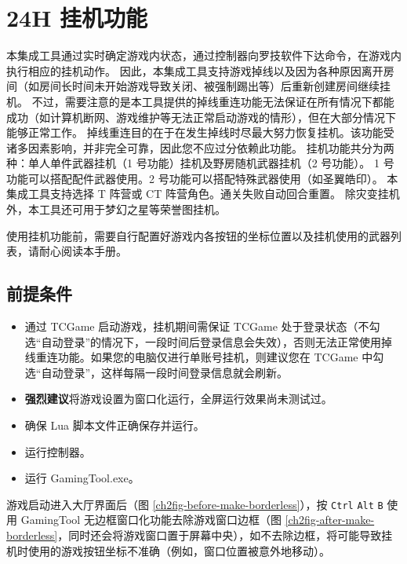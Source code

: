 \section{24H 挂机功能}

本集成工具通过实时确定游戏内状态，通过控制器向罗技软件下达命令，在游戏内执行相应的挂机动作。
因此，本集成工具支持游戏掉线以及因为各种原因离开房间（如房间长时间未开始游戏导致关闭、被强制踢出等）后重新创建房间继续挂机。
不过，需要注意的是本工具提供的掉线重连功能无法保证在所有情况下都能成功（如计算机断网、游戏维护等无法正常启动游戏的情形），但在大部分情况下能够正常工作。
掉线重连目的在于在发生掉线时尽最大努力恢复挂机。该功能受诸多因素影响，并非完全可靠，因此您不应过分依赖此功能。
挂机功能共分为两种：单人单件武器挂机（1 号功能）挂机及野房随机武器挂机（2 号功能）。
1 号功能可以搭配配件武器使用。2 号功能可以搭配特殊武器使用（如圣翼皓印）。
本集成工具支持选择 T 阵营或 CT 阵营角色。通关失败自动回合重置。
除灾变挂机外，本工具还可用于梦幻之星等荣誉图挂机。

使用挂机功能前，需要自行配置好游戏内各按钮的坐标位置以及挂机使用的武器列表，请耐心阅读本手册。

\subsection{前提条件}

\begin{itemize}

\item 通过 TCGame 启动游戏，挂机期间需保证 TCGame 处于登录状态（不勾选“自动登录”的情况下，一段时间后登录信息会失效），否则无法正常使用掉线重连功能。如果您的电脑仅进行单账号挂机，则建议您在 TCGame 中勾选“自动登录”，这样每隔一段时间登录信息就会刷新。

\item \textbf{\color{red}强烈建议}将游戏设置为窗口化运行，全屏运行效果尚未测试过。

\item 确保 Lua 脚本文件正确保存并运行。

\item 运行控制器。

\item 运行 GamingTool.exe。

\end{itemize}

游戏启动进入大厅界面后（图 \ref{ch2fig-before-make-borderless}），按 \lstinline{Ctrl} \lstinline{Alt} \lstinline{B} 使用 GamingTool 无边框窗口化功能去除游戏窗口边框（图 \ref{ch2fig-after-make-borderless}，同时还会将游戏窗口置于屏幕中央），如不去除边框，将可能导致挂机时使用的游戏按钮坐标不准确（例如，窗口位置被意外地移动）。

